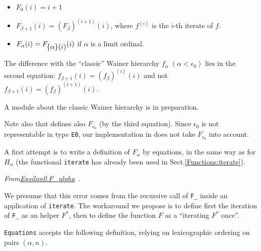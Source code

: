 \label{F_equations}
\begin{itemize}
\item $F_0(i)=i+1$
\item $F_{\beta+1}(i)= (F_\beta)^{(i+1)}(i)$, where $f^{(i)}$ is the $i$-th iterate of $f$.
\item $F_\alpha(i) = F_{\mbox{$\{\alpha\}(i)$}} (i)$ if $\alpha$ is a limit ordinal.
\end{itemize}

\begin{remark}
The difference with the ``classic'' Wainer hierarchy 
$f_\alpha\;(\alpha<\epsilon_0)$ lies in the second equation:
$f_{\beta+1}(i) = (f_\beta)^{(i)}(i)$ and not
$f_{\beta+1}(i) = (f_\beta)^{(i+1)}(i)$.

A module about 
the classic Wainer hierarchy is in preparation.

Note also that \cite{KS81} defines also $F_{\epsilon_0}$ (by the third equation). Since $\epsilon_0$ is not representable in type \texttt{E0}, our implementation in \coq{} does not take $F_{\epsilon_0}$ into account.

\end{remark}

A first attempt is to write a definition of $F_\alpha$ by equations, in the same way as for $H_\alpha$ (the functional \texttt{iterate} has already been used in Sect.\vref{Functions:iterate}).







\emph{From\href{../theories/html/hydras.Epsilon0.F_alpha.html}{Epsilon0.F\_alpha}~}.


 
 


We presume that this error comes from the recursive call of \texttt{F\_} inside
an application of \texttt{iterate}. The workaround we propose is to define first 
the iteration of \texttt{F\_}  as an helper $F^*$, then to define the function $F$ as a ``iterating $F^*$ once''.

\texttt{Equations} accepts the following definition, relying on  lexicographic ordering on pairs $(\alpha,n)$.


\label{sect:F-equations}

\label{Functions:F-alpha}
  
